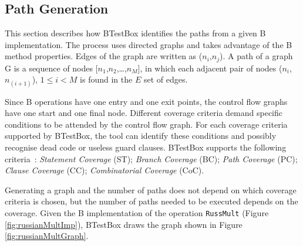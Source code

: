 \documentclass[runningheads]{llncs}
\begin{document}
\subsection{Path Generation}

This section describes how BTestBox identifies the paths from a given B implementation. 
The process uses directed graphs and takes advantage of the B method properties. 
Edges of the graph are written as ($n_i$,$n_j$).
A path of a graph G is a sequence of nodes [$n_1$,$n_2$,\ldots,$n_M$], in which each adjacent pair of nodes ($n_i$, $n_{(i+1)}$), $1 \leq i < M$ is found in the $E$ set of edges.

Since B operations have one entry and one exit points, the control flow graphs have one start and one final node.
Different coverage criteria demand specific conditions to be attended by the control flow graph.
For each coverage criteria supported by BTestBox, the tool can identify these conditions and possibly recognise dead code or useless guard clauses. 
BTestBox supports the following criteria~\cite{ammann2008introduction}:
\textit{Statement Coverage} (ST); 
\textit{Branch Coverage} (BC);
\textit{Path Coverage} (PC);
\textit{Clause Coverage} (CC);
\textit{Combinatorial Coverage} (CoC).

Generating a graph and the number of paths does not depend on which coverage criteria is chosen, but the number of paths needed to be executed depends on the coverage. 
Given the B implementation of the operation \texttt{RussMult} (Figure \ref{fig:russianMultImp}), BTestBox draws the graph shown in Figure \ref{fig:russianMultGraph}.
        
\end{document}
